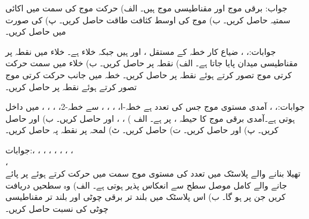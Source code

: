 جواب:
برقی موج  اور مقناطیسی موج
  ہیں۔ الف) حرکت موج کی سمت میں اکائی سمتیہ حاصل کریں۔ ب) موج کی اوسط کثافت طاقت حاصل کریں۔ پ)  کی صورت میں  حاصل کریں۔

جوابات:، ، 
ضیاع کار خطہ  کے مستقل ،  اور  ہیں  جبکہ  خلاء ہے۔ خلاء میں نقطہ  پر مقناطیسی میدان  پایا جاتا ہے۔ الف) نقطہ  پر  حاصل کریں۔ ب) خلاء میں  سمت حرکت کرتی موج تصور کرتے ہوئے  نقطہ  پر
  حاصل کریں۔ خطہ  میں  جانب حرکت کرتی موج تصور کرتے ہوئے  نقطہ  پر  حاصل کریں۔

جوابات:، 
،
آمدی مستوی موج جس کی تعدد  ہے خطہ-ا، ، ، ،  سے  خطہ-2، ، ، ،  میں داخل ہوتی ہے۔آمدی برقی موج کا حیطہ ،   پر  ہے۔ الف ) ، ،   اور  حاصل کریں۔ ب)  اور  حاصل کریں۔ پ)  اور  حاصل کریں۔ ت)  حاصل کریں۔ ٹ) لمحہ  پر نقطہ  پہ  حاصل کریں۔

جوابات:، ، ،
 ، ، ،
 ،
 ،\\
  ، \\ 
تھیلا بنانے والے پلاسٹک میں  تعدد کی مستوی موج  سمت میں حرکت کرتے ہوئے   پر پائے جانے والے کامل موصل سطح سے انعکاس پذیر ہوتی ہے۔ الف) وہ سطحیں دریافت کریں جن پر  ہو گا۔ ب) اس پلاسٹک  میں بلند تر برقی چوٹی اور بلند تر مقناطیسی چوٹی کی نسبت  حاصل کریں۔ 

